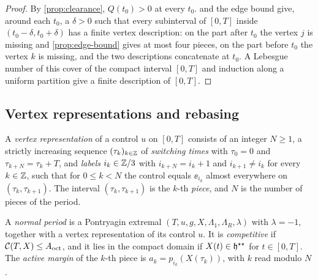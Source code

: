 \begin{proof}
By \cref{prop:clearance}, $Q(t_0)>0$ at every $t_0$.  and the edge bound
give, around each $t_0$, a $\delta>0$ such that every subinterval of $[0,T]$ inside
$(t_0-\delta,t_0+\delta)$ has a finite vertex description: on the part after $t_0$ the vertex $j$
is missing and \cref{prop:edge-bound} gives at most four pieces, on the part before $t_0$ the vertex
$k$ is missing, and the two descriptions concatenate at $t_0$. A Lebesgue number of this cover of
the compact interval $[0,T]$ and induction along a uniform partition give a finite description of
$[0,T]$.
\end{proof}

\subsection{Vertex representations and rebasing}\label{red:rebase}

\begin{definition}\label{def:vertex-representation}
A \emph{vertex representation} of a control $u$ on $[0,T]$ consists of an integer $N\ge1$, a
strictly increasing sequence $(\tau_k)_{k\in\mathbb{Z}}$ of \emph{switching times} with $\tau_0=0$ and
$\tau_{k+N}=\tau_k+T$, and \emph{labels} $i_k\in\mathbb{Z}/3$ with $i_{k+N}=i_k+1$ and $i_{k+1}\ne i_k$ for
every $k\in\mathbb{Z}$, such that for $0\le k<N$ the control equals $\ee_{i_k}$ almost everywhere on
$(\tau_k,\tau_{k+1})$. The interval $(\tau_k,\tau_{k+1})$ is the
$k$-th \emph{piece}, and $N$ is the number of pieces of the period.
\end{definition}

\begin{definition}\label{def:normal-period}
A \emph{normal period} is a Pontryagin extremal $(T,u,g,X,\Lambda_1,\Lambda_R,\lambda)$ with
$\lambda=-1$, together with a vertex representation of its control $u$. It is
\emph{competitive} if $\mathcal{C}(T,X)\le A_{\mathrm{oct}}$, and it lies in the
compact domain if $X(t)\in\mathfrak{h}^{\star\star}$ for $t\in[0,T]$. The
\emph{active margin} of the $k$-th piece is $a_k=p_{i_k}(X(\tau_k))$, with $k$ read modulo $N$.
\end{definition}


